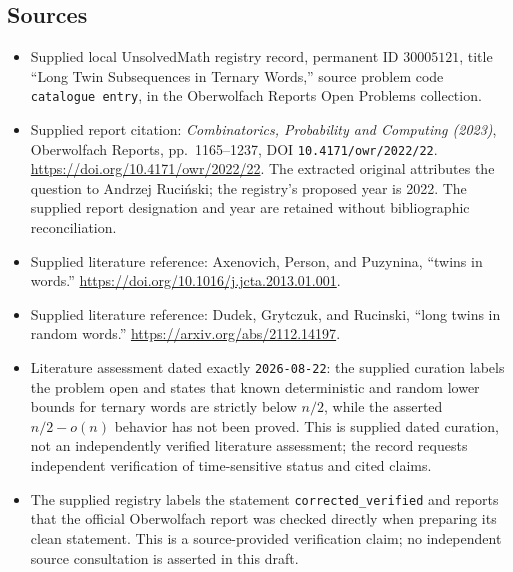 \documentclass[11pt]{article}
\begin{document}
\subsection{Sources}
\begin{itemize}
\item Supplied local UnsolvedMath registry record, permanent ID \(30005121\), title ``Long Twin Subsequences in Ternary Words,'' source problem code \texttt{catalogue entry}, in the Oberwolfach Reports Open Problems collection.
\item Supplied report citation: \emph{Combinatorics, Probability and Computing (2023)}, Oberwolfach Reports, pp.\ 1165--1237, DOI \texttt{10.4171/owr/2022/22}. \url{https://doi.org/10.4171/owr/2022/22}. The extracted original attributes the question to Andrzej Ruci\'nski; the registry's proposed year is 2022. The supplied report designation and year are retained without bibliographic reconciliation.
\item Supplied literature reference: Axenovich, Person, and Puzynina, ``twins in words.'' \url{https://doi.org/10.1016/j.jcta.2013.01.001}.
\item Supplied literature reference: Dudek, Grytczuk, and Rucinski, ``long twins in random words.'' \url{https://arxiv.org/abs/2112.14197}.
\item Literature assessment dated exactly \texttt{2026-08-22}: the supplied curation labels the problem open and states that known deterministic and random lower bounds for ternary words are strictly below \(n/2\), while the asserted \(n/2-o(n)\) behavior has not been proved. This is supplied dated curation, not an independently verified literature assessment; the record requests independent verification of time-sensitive status and cited claims.
\item The supplied registry labels the statement \texttt{corrected\_verified} and reports that the official Oberwolfach report was checked directly when preparing its clean statement. This is a source-provided verification claim; no independent source consultation is asserted in this draft.
\end{itemize}
\end{document}
